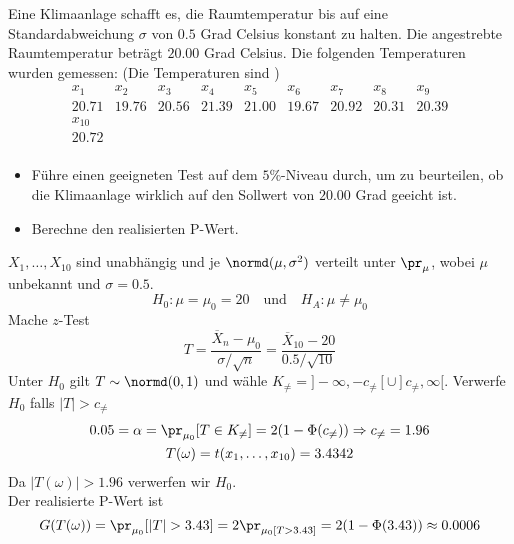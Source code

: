 \begin{example}
	Eine Klimaanlage schafft es, die Raumtemperatur bis auf eine Standardabweichung $\sigma$ von $0.5$ Grad Celsius
	konstant zu halten. Die angestrebte Raumtemperatur beträgt $20.00$ Grad Celsius. Die folgenden Temperaturen wurden gemessen:
	(Die Temperaturen sind \iid)
	\begin{equation*}
		\begin{array}{ccccccccc}
			x_1 & x_2 & x_3 & x_4 & x_5 & x_6 & x_7 & x_8 & x_9 \\
			20.71 & 19.76 & 20.56 & 21.39 & 21.00 & 19.67 & 20.92 & 20.31 & 20.39 \\
			x_{10} & & & & & & & & \\
			20.72 & & & & & & & & \\
		\end{array}
	\end{equation*}
	\begin{itemize}
		\item Führe einen geeigneten Test auf dem $5\%$-Niveau durch, um zu beurteilen, ob die Klimaanlage wirklich auf
			den Sollwert von $20.00$ Grad geeicht ist.
		\item Berechne den realisierten P-Wert.
	\end{itemize}
	\tcblower
	$X_{1}, \ldots, X_{10}$ sind unabhängig und je $\normd(\mu, \sigma^2)$ verteilt unter $\pr_\mu$, wobei $\mu$
	unbekannt und $\sigma = 0.5$.
	\begin{equation*}
		H_0 : \mu = \mu_0 = 20 \quad \text{und} \quad H_A : \mu \neq \mu_0
	\end{equation*}
	Mache $z$-Test
	\begin{equation*}
		T = \frac{\overline{X}_n - \mu_0}{\sigma / \sqrt{n}} = \frac{\overline{X}_{10} - 20}{0.5/\sqrt{10}} 
	\end{equation*}
	Unter $H_0$ gilt $T \sim \normd(0,1)$ und wähle $K_{\neq} = ]-\infty,-c_{\neq}[ \cup ]c_{\neq},\infty[$. Verwerfe
	$H_0$ falls $|T| > c_{\neq}$
	\begin{gather*}
		0.05 = \alpha = \pr_{\mu_0} [T \in K_{\neq}] = 2(1- \Phi (c_{\neq})) \Rightarrow c_{\neq} = 1.96\\
		T(\omega) = t(x_{1}, \ldots, x_{10}) = 3.4342
	\end{gather*}
	Da $|T(\omega)| > 1.96$ verwerfen wir $H_0$.\\
	Der realisierte P-Wert ist
	\begin{equation*}
		G(T(\omega)) = \pr_{\mu_0} [|T| > 3.43] = 2 \pr_{\mu_0 [T > 3.43]} = 2(1 - \Phi(3.43)) \approx 0.0006
	\end{equation*}
\end{example}
